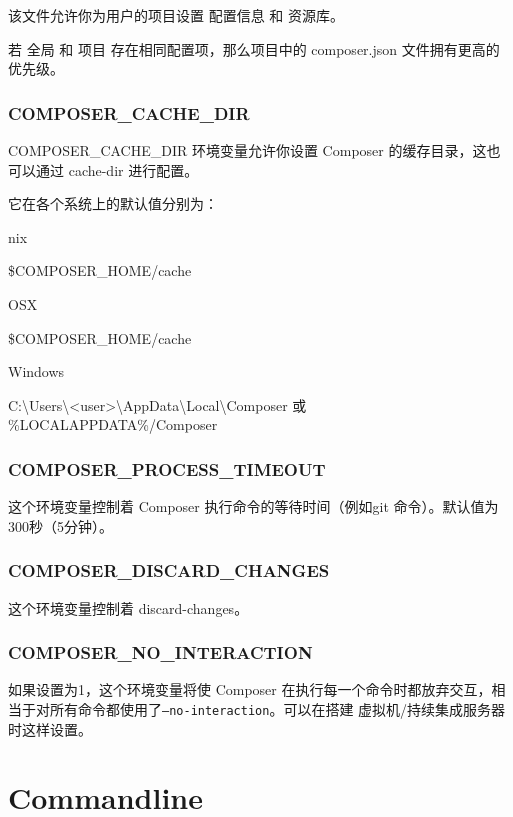 该文件允许你为用户的项目设置 配置信息 和 资源库。

若 全局 和 项目 存在相同配置项，那么项目中的 composer.json 文件拥有更高的优先级。

\subsection{COMPOSER\_CACHE\_DIR}

COMPOSER\_CACHE\_DIR 环境变量允许你设置 Composer 的缓存目录，这也可以通过 cache-dir 进行配置。

它在各个系统上的默认值分别为：

\begin{compactitem}
\item *nix

\$COMPOSER\_HOME/cache
\item OSX

\$COMPOSER\_HOME/cache
\item Windows

C:\textbackslash Users\textbackslash <user>\textbackslash AppData\textbackslash Local\textbackslash Composer 或 \%LOCALAPPDATA\%/Composer
\end{compactitem}

\subsection{COMPOSER\_PROCESS\_TIMEOUT}

这个环境变量控制着 Composer 执行命令的等待时间（例如git 命令）。默认值为300秒（5分钟）。

\subsection{COMPOSER\_DISCARD\_CHANGES}

这个环境变量控制着 discard-changes。

\subsection{COMPOSER\_NO\_INTERACTION}

如果设置为1，这个环境变量将使 Composer 在执行每一个命令时都放弃交互，相当于对所有命令都使用了\texttt{--no-interaction}。可以在搭建 虚拟机/持续集成服务器 时这样设置。



\chapter{Commandline}

